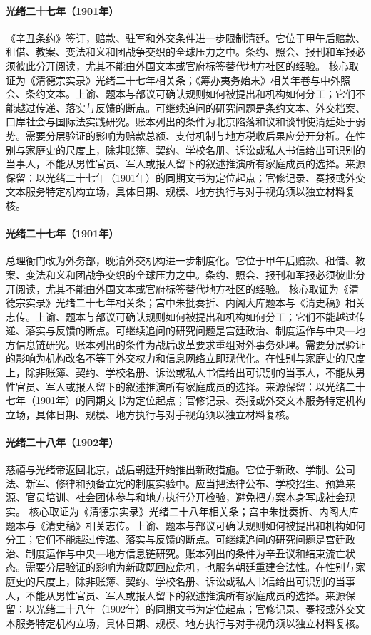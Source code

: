 \hypertarget{public:EQ-1901-BOXER-PROTOCOL}{}\paragraph{光绪二十七年（1901年）}《辛丑条约》签订，赔款、驻军和外交条件进一步限制清廷。它位于甲午后赔款、租借、教案、变法和义和团战争交织的全球压力之中。条约、照会、报刊和军报必须彼此分开阅读，尤其不能由外国文本或官府标签替代地方社区的经验。 核心取证为《清德宗实录》光绪二十七年相关条；《筹办夷务始末》相关年卷与中外照会、条约文本。上谕、题本与部议可确认规则如何被提出和机构如何分工；它们不能越过传递、落实与反馈的断点。可继续追问的研究问题是条约文本、外交档案、口岸社会与国际法实践研究。账本列出的条件为北京陷落和议和谈判使清廷处于弱势。需要分层验证的影响为赔款总额、支付机制与地方税收后果应分开分析。在性别与家庭史的尺度上，除非账簿、契约、学校名册、诉讼或私人书信给出可识别的当事人，不能从男性官员、军人或报人留下的叙述推演所有家庭成员的选择。来源保留：以光绪二十七年（1901年）的同期文书为定位起点；官修记录、奏报或外交文本服务特定机构立场，具体日期、规模、地方执行与对手视角须以独立材料复核。
\hypertarget{public:EQ-1901-ZONGLI-YAMEN-REPLACED}{}\paragraph{光绪二十七年（1901年）}总理衙门改为外务部，晚清外交机构进一步制度化。它位于甲午后赔款、租借、教案、变法和义和团战争交织的全球压力之中。条约、照会、报刊和军报必须彼此分开阅读，尤其不能由外国文本或官府标签替代地方社区的经验。 核心取证为《清德宗实录》光绪二十七年相关条；宫中朱批奏折、内阁大库题本与《清史稿》相关志传。上谕、题本与部议可确认规则如何被提出和机构如何分工；它们不能越过传递、落实与反馈的断点。可继续追问的研究问题是宫廷政治、制度运作与中央—地方信息链研究。账本列出的条件为战后改革要求重组对外事务处理。需要分层验证的影响为机构改名不等于外交权力和信息网络立即现代化。在性别与家庭史的尺度上，除非账簿、契约、学校名册、诉讼或私人书信给出可识别的当事人，不能从男性官员、军人或报人留下的叙述推演所有家庭成员的选择。来源保留：以光绪二十七年（1901年）的同期文书为定位起点；官修记录、奏报或外交文本服务特定机构立场，具体日期、规模、地方执行与对手视角须以独立材料复核。
\hypertarget{public:EQ-1902-CIXI-RETURN-BEIJING}{}\paragraph{光绪二十八年（1902年）}慈禧与光绪帝返回北京，战后朝廷开始推出新政措施。它位于新政、学制、公司法、新军、修律和预备立宪的制度实验中。应当把法律公布、学校招生、预算来源、官员培训、社会团体参与和地方执行分开检验，避免把方案本身写成社会现实。 核心取证为《清德宗实录》光绪二十八年相关条；宫中朱批奏折、内阁大库题本与《清史稿》相关志传。上谕、题本与部议可确认规则如何被提出和机构如何分工；它们不能越过传递、落实与反馈的断点。可继续追问的研究问题是宫廷政治、制度运作与中央—地方信息链研究。账本列出的条件为辛丑议和结束流亡状态。需要分层验证的影响为新政既回应危机，也服务朝廷重建合法性。在性别与家庭史的尺度上，除非账簿、契约、学校名册、诉讼或私人书信给出可识别的当事人，不能从男性官员、军人或报人留下的叙述推演所有家庭成员的选择。来源保留：以光绪二十八年（1902年）的同期文书为定位起点；官修记录、奏报或外交文本服务特定机构立场，具体日期、规模、地方执行与对手视角须以独立材料复核。
